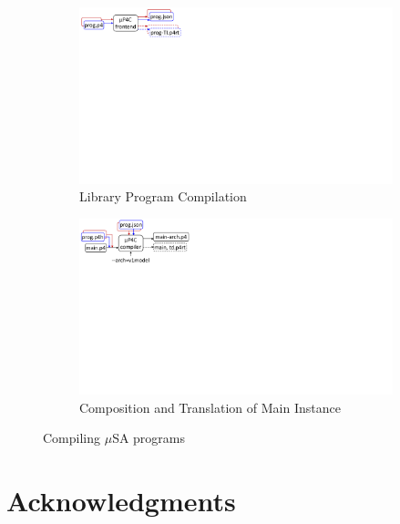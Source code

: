 \documentclass{hotnets19}
\begin{document}
\begin{figure}[!h]
    \begin{subfigure}{\linewidth}
        \centering
        \includegraphics[trim=0 450 645 0, clip,scale=0.55]{mp4c-frontend}
        \caption{Library Program Compilation}
        \label{subfig:compiling-modules}
    \end{subfigure}
    \begin{subfigure}{\linewidth}
        \centering
        \includegraphics[trim=0 405 623 0, clip,scale=0.55]{mp4c-compiler}
        \caption{Composition and Translation of Main Instance}
        \label{subfig:composition-translation-of-main-instance}
    \end{subfigure}
\caption{Compiling $\mu$SA programs}
\label{fig:compiling-msa-programs}
\end{figure}






\section*{Acknowledgments}

 
\begin{small}

\end{small}
\end{document}
